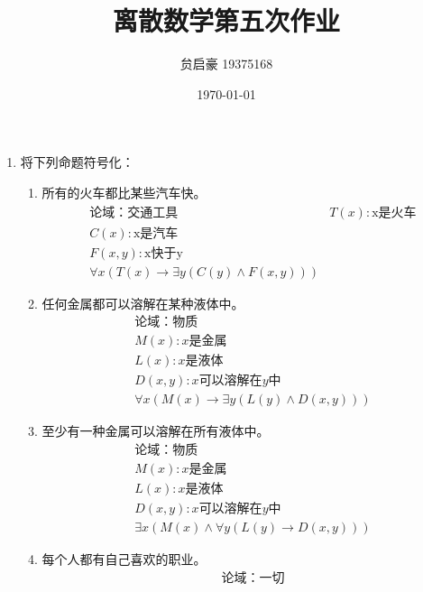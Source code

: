 \documentclass[UTF8]{ctexart}
\title{离散数学第五次作业}
\author{贠启豪 19375168}
\date{\today}
\begin{document}
   \maketitle
   \begin{enumerate}
       \item 将下列命题符号化：
       \begin{enumerate}
           \item 所有的火车都比某些汽车快。
            \[
                \begin{aligned}
                    &\text{论域：交通工具}
                    &T(x):\text{x是火车}\\
                    &C(x):\text{x是汽车}\\
                    &F(x,y):\text{x快于y}\\
                    &\forall x(T(x)\rightarrow \exists y(C(y)\wedge F(x,y)))
                \end{aligned}
            \]
           \item 任何金属都可以溶解在某种液体中。
           \[
               \begin{aligned}
                   &\text{论域：物质}\\
                   &M(x):\text{$x$是金属}\\
                   &L(x):\text{$x$是液体}\\
                   &D(x,y):\text{$x$可以溶解在$y$中}\\
                   &\forall x(M(x)\rightarrow \exists y(L(y)\wedge D(x,y)))
                \end{aligned}
           \]
           \item 至少有一种金属可以溶解在所有液体中。
           \[
               \begin{aligned}
                   &\text{论域：物质}\\
                   &M(x):\text{$x$是金属}\\
                   &L(x):\text{$x$是液体}\\
                   &D(x,y):\text{$x$可以溶解在$y$中}\\
                   &\exists x(M(x)\wedge \forall y(L(y)\rightarrow D(x,y)))
                \end{aligned}
           \]
           \item 每个人都有自己喜欢的职业。
           \[
               \begin{aligned}
                   &\text{论域：一切}\\

\end{aligned}\]
\end{enumerate}
\end{enumerate}
\end{document}
